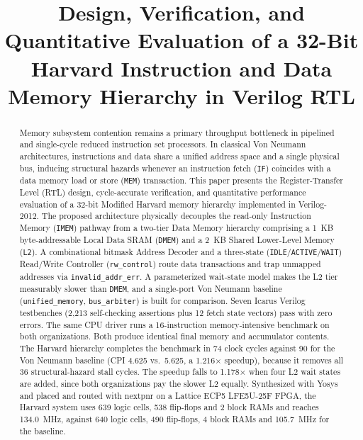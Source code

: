 \documentclass[conference]{IEEEtran}
\begin{document}
\title{Design, Verification, and Quantitative Evaluation of a 32-Bit Harvard Instruction and Data Memory Hierarchy in Verilog RTL}

\author{
}

\maketitle

\begin{abstract}
Memory subsystem contention remains a primary throughput bottleneck in pipelined and single-cycle reduced instruction set processors. In classical Von Neumann architectures, instructions and data share a unified address space and a single physical bus, inducing structural hazards whenever an instruction fetch (\texttt{IF}) coincides with a data memory load or store (\texttt{MEM}) transaction. This paper presents the Register-Transfer Level (RTL) design, cycle-accurate verification, and quantitative performance evaluation of a 32-bit Modified Harvard memory hierarchy implemented in Verilog-2012. The proposed architecture physically decouples the read-only Instruction Memory (\texttt{IMEM}) pathway from a two-tier Data Memory hierarchy comprising a 1~KB byte-addressable Local Data SRAM (\texttt{DMEM}) and a 2~KB Shared Lower-Level Memory (\texttt{L2}). A combinational bitmask Address Decoder and a three-state (\texttt{IDLE}/\texttt{ACTIVE}/\texttt{WAIT}) Read/Write Controller (\texttt{rw\_control}) route data transactions and trap unmapped addresses via \texttt{invalid\_addr\_err}. A parameterized wait-state model makes the L2 tier measurably slower than \texttt{DMEM}, and a single-port Von Neumann baseline (\texttt{unified\_memory}, \texttt{bus\_arbiter}) is built for comparison. Seven Icarus Verilog testbenches (2,213 self-checking assertions plus 12 fetch state vectors) pass with zero errors. The same CPU driver runs a 16-instruction memory-intensive benchmark on both organizations. Both produce identical final memory and accumulator contents. The Harvard hierarchy completes the benchmark in 74 clock cycles against 90 for the Von Neumann baseline (CPI 4.625 vs.\ 5.625, a 1.216$\times$ speedup), because it removes all 36 structural-hazard stall cycles. The speedup falls to 1.178$\times$ when four L2 wait states are added, since both organizations pay the slower L2 equally. Synthesized with Yosys and placed and routed with nextpnr on a Lattice ECP5 LFE5U-25F FPGA, the Harvard system uses 639 logic cells, 538 flip-flops and 2 block RAMs and reaches 134.0~MHz, against 640 logic cells, 490 flip-flops, 4 block RAMs and 105.7~MHz for the baseline.
\end{abstract}
\end{document}

